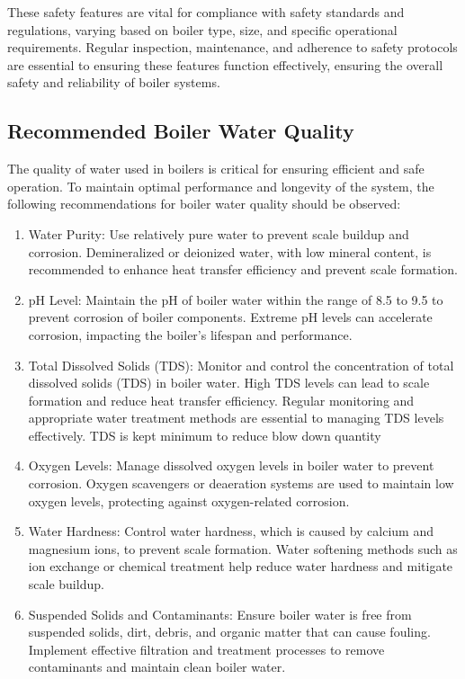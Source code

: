 These safety features are vital for compliance with safety standards and regulations, varying based on boiler type, size, and specific operational requirements. Regular inspection, maintenance, and adherence to safety protocols are essential to ensuring these features function effectively, ensuring the overall safety and reliability of boiler systems.


\subsection{Recommended Boiler Water Quality}
The quality of water used in boilers is critical for ensuring efficient and safe operation. To maintain optimal performance and longevity of the system, the following recommendations for boiler water quality should be observed:

\begin{enumerate}
\item Water Purity:
Use relatively pure water to prevent scale buildup and corrosion. Demineralized or deionized water, with low mineral content, is recommended to enhance heat transfer efficiency and prevent scale formation.
\item pH Level:
Maintain the pH of boiler water within the range of 8.5 to 9.5 to prevent corrosion of boiler components. Extreme pH levels can accelerate corrosion, impacting the boiler's lifespan and performance.
\item Total Dissolved Solids (TDS):
Monitor and control the concentration of total dissolved solids (TDS) in boiler water. High TDS levels can lead to scale formation and reduce heat transfer efficiency. Regular monitoring and appropriate water treatment methods are essential to managing TDS levels effectively. TDS is kept minimum to reduce blow down quantity
\item Oxygen Levels:
Manage dissolved oxygen levels in boiler water to prevent corrosion. Oxygen scavengers or deaeration systems are used to maintain low oxygen levels, protecting against oxygen-related corrosion.
\item Water Hardness:
Control water hardness, which is caused by calcium and magnesium ions, to prevent scale formation. Water softening methods such as ion exchange or chemical treatment help reduce water hardness and mitigate scale buildup.
\item Suspended Solids and Contaminants:
Ensure boiler water is free from suspended solids, dirt, debris, and organic matter that can cause fouling. Implement effective filtration and treatment processes to remove contaminants and maintain clean boiler water.
\end{enumerate}

